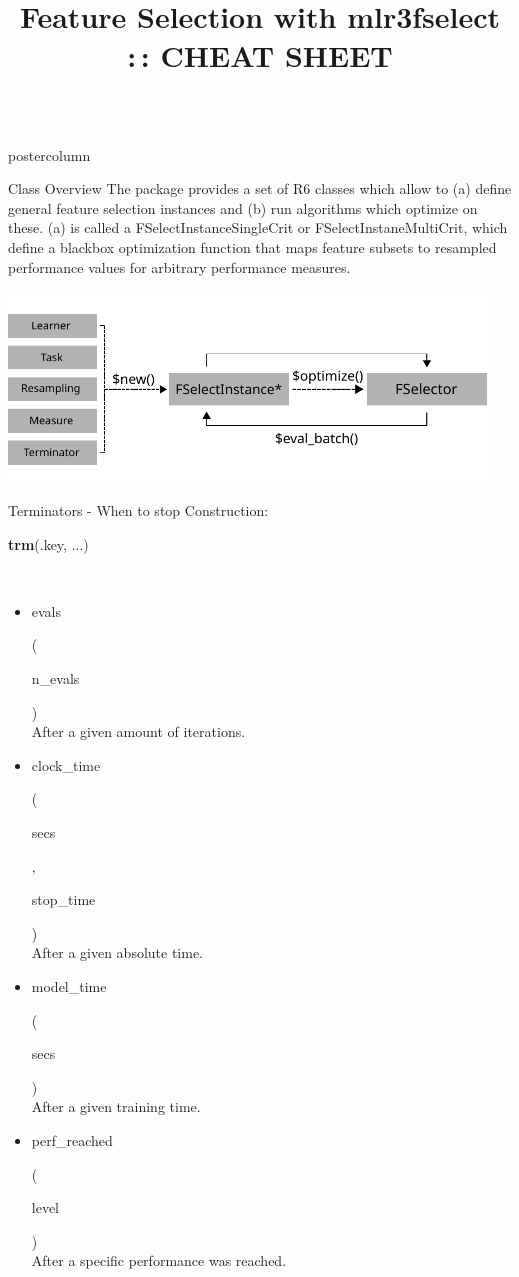\documentclass{beamer}
\title{Feature Selection with mlr3fselect :\,: CHEAT SHEET} %
\newlength{\columnheight} %
\newcommand{\codeinline}[1]{\begin{codeboxinline}#1\end{codeboxinline}}
\begin{document}
\begin{frame}[fragile]{}
	\begin{columns}
		\begin{column}{.245\textwidth}
			\begin{beamercolorbox}[center]{postercolumn}
				\begin{minipage}{.98\textwidth}
					\parbox[t][\columnheight]{\textwidth}{
						\begin{myblock}{Class Overview}
							The package provides a set of R6 classes which allow to (a) define general
							feature selection instances and (b) run algorithms which optimize on these.
							(a) is called a FSelectInstanceSingleCrit or FSelectInstaneMultiCrit, which define a blackbox optimization function that maps feature subsets to resampled performance values for arbitrary performance measures.\\
							\\
							\includegraphics[width=0.95\textwidth]{img/class_diagram.pdf}
						\end{myblock}
						\begin{myblock}{Terminators - When to stop}
						Construction: \codeinline{\textbf{trm}(.key, ...)}
						\\
						\begin{itemize}
							\item \codeinline{evals}
							(\codeinline{n\_evals})\\
							After a given amount of iterations.
							\item \codeinline{clock\_time}
							(\codeinline{secs}, \codeinline{stop\_time})\\
							After a given absolute time.
							\item \codeinline{model\_time}
							(\codeinline{secs })\\
							After a given training time.
							\item \codeinline{perf\_reached}
							(\codeinline{level})\\
							After a specific performance was reached.

\end{itemize}
\end{myblock}}
\end{minipage}
\end{beamercolorbox}
\end{column}
\end{columns}
\end{frame}
\end{document}
